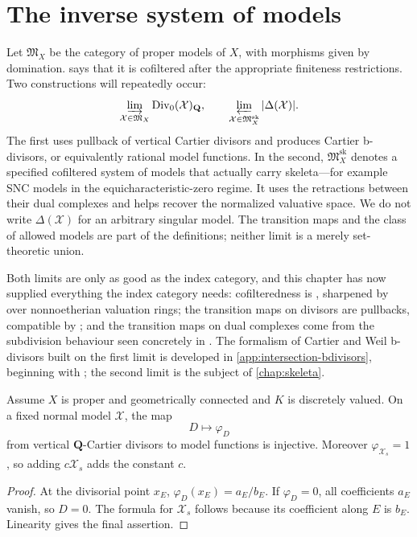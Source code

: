 \section{The inverse system of models}

Let $\mathfrak M_X$ be the category of proper models of $X$, with morphisms
given by domination.  says that it is
cofiltered after the appropriate finiteness restrictions. Two constructions
will repeatedly occur:
\[
       \varinjlim_{\mathcal X\in\mathfrak M_X}
       \operatorname{Div}_0(\mathcal X)_{\mathbf Q},
       \qquad
       \varprojlim_{\mathcal X\in\mathfrak M_X^{\mathrm{sk}}}
       |\Delta(\mathcal X)|.
\]
The first uses pullback of vertical Cartier divisors and produces Cartier
b-divisors, or equivalently rational model functions.  In the second,
$\mathfrak M_X^{\mathrm{sk}}$ denotes a specified cofiltered system of models
that actually carry skeleta---for example SNC models in the
equicharacteristic-zero regime.  It uses the retractions between their dual
complexes and helps recover the normalized valuative space.  We do not write
$\Delta(\mathcal X)$ for an arbitrary singular model.  The transition maps
and the class of allowed models are part of the definitions; neither limit
is a merely set-theoretic union.

Both limits are only as good as the index category, and this chapter has
now supplied everything the index category needs: cofilteredness is
, sharpened by
 over nonnoetherian valuation
rings; the transition maps on divisors are pullbacks, compatible by
; and the transition maps on dual
complexes come from the subdivision behaviour seen concretely in
.  The formalism of Cartier and Weil b-divisors
built on the first limit is developed in \cref{app:intersection-bdivisors},
beginning with ; the second limit is the
subject of \cref{chap:skeleta}.

\begin{proposition}
\label{prop:divisor-model-function-injective-mod-fibre}
Assume $X$ is proper and geometrically connected and $K$ is discretely
valued. On a fixed normal model $\mathcal X$, the map
\[
 D\longmapsto\varphi_D
\]
from vertical $\mathbf Q$-Cartier divisors to model functions is injective.
Moreover $\varphi_{\mathcal X_s}=1$, so adding
$c\mathcal X_s$ adds the constant $c$.
\end{proposition}
\begin{proof}
At the divisorial point $x_E$,
$\varphi_D(x_E)=a_E/b_E$. If $\varphi_D=0$, all coefficients $a_E$ vanish,
so $D=0$. The formula for $\mathcal X_s$ follows because its coefficient
along $E$ is $b_E$. Linearity gives the final assertion.
\end{proof}

